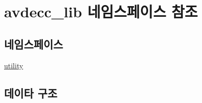 \hypertarget{namespaceavdecc__lib}{}\section{avdecc\+\_\+lib 네임스페이스 참조}
\label{namespaceavdecc__lib}
\subsection*{네임스페이스}
\begin{DoxyCompactItemize}
\item 
 \hyperlink{namespaceavdecc__lib_1_1utility}{utility}
\end{DoxyCompactItemize}
\subsection*{데이타 구조}
